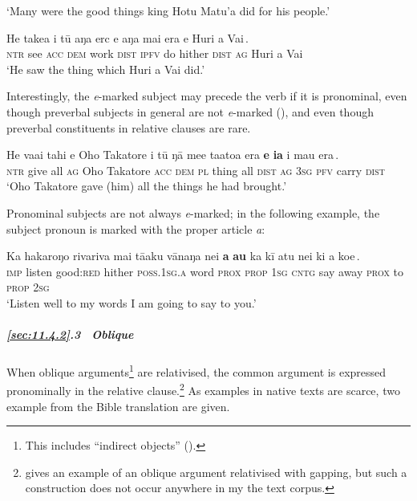 \glt 
‘Many were the good things king Hotu Matu’a did for his people.’ \textstyleExampleref{[R369.024]} 
\z

\ea\label{ex:11.92}
\gll He take{\ꞌ}a i tū aŋa erc {\ob}e aŋa mai era e Huri {\ꞌ}a Vai\,{\cb}. \\
\textsc{ntr} see \textsc{acc} \textsc{dem} work \textsc{dist} {\db}\textsc{ipfv} do hither \textsc{dist} \textsc{ag} Huri a Vai \\

\glt
‘He saw the thing which Huri a Vai did.’ \textstyleExampleref{[R304.004]} 
\z

Interestingly, the \textit{e}{}-marked subject may precede the verb if it is pronominal, even though preverbal subjects in general are not \textit{e}{}-marked (), and even though preverbal constituents in relative clauses are rare.

\ea\label{ex:11.93}
\gll He va{\ꞌ}ai tahi e {\ꞌ}Oho Takatore i tū ŋā me{\ꞌ}e ta{\ꞌ}ato{\ꞌ}a era   {\ob}\textbf{e} \textbf{ia} i ma{\ꞌ}u era\,{\cb}.\\
\textsc{ntr} give all \textsc{ag} Oho Takatore \textsc{acc} \textsc{dem} \textsc{pl} thing all \textsc{dist}  {\db}\textsc{ag} \textsc{3sg} \textsc{pfv} carry \textsc{dist}\\

\glt
‘Oho Takatore gave (him) all the things he had brought.’ \textstyleExampleref{[R304.115]} 
\z

Pronominal subjects are not always \textit{e}{}-marked; in the following example, the subject pronoun is marked with the proper article \textit{a}:

\ea\label{ex:11.94}
\gll Ka hakaroŋo rivariva mai tā{\ꞌ}aku vānaŋa nei {\ob}\textbf{a} \textbf{au}  ka kī atu nei ki a koe\,{\cb}.\\
\textsc{imp} listen good:\textsc{red} hither \textsc{poss.1sg.a} word \textsc{prox} {\db}\textsc{prop} \textsc{1sg}  \textsc{cntg} say away \textsc{prox} to \textsc{prop} \textsc{2sg}\\

\glt 
‘Listen well to my words I am going to say to you.’ \textstyleExampleref{[R229.243]} 
\z

\subparagraph{\ref{sec:11.4.2}.3~ Oblique} When oblique arguments\footnote{\label{fn:511}This includes “indirect objects” ().} are relativised, the common argument is expressed pronominally in the relative clause.\footnote{\label{fn:512}\citet[1]{Silva-Corvalán1978} gives an example of an oblique argument relativised with gapping, but such a construction does not occur anywhere in my the text corpus.} As examples in native texts are scarce, two example from the Bible translation are given.

